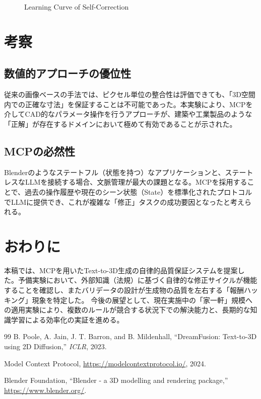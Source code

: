 \documentclass{deimj}
\begin{document}
\begin{figure}[t]
 \centering
 \caption{Learning Curve of Self-Correction}
 \label{fig:learning_curve}
\end{figure}

\section{考察}

\subsection{数値的アプローチの優位性}
従来の画像ベースの手法では、ピクセル単位の整合性は評価できても、「3D空間内での正確な寸法」を保証することは不可能であった。本実験により、MCPを介してCAD的なパラメータ操作を行うアプローチが、建築や工業製品のような「正解」が存在するドメインにおいて極めて有効であることが示された。

\subsection{MCPの必然性}
Blenderのようなステートフル（状態を持つ）なアプリケーションと、ステートレスなLLMを接続する場合、文脈管理が最大の課題となる。MCPを採用することで、過去の操作履歴や現在のシーン状態（State）を標準化されたプロトコルでLLMに提供でき、これが複雑な「修正」タスクの成功要因となったと考えられる。

\section{おわりに}
本稿では、MCPを用いたText-to-3D生成の自律的品質保証システムを提案した。予備実験において、外部知識（法規）に基づく自律的な修正サイクルが機能することを確認し、またバリデータの設計が生成物の品質を左右する「報酬ハッキング」現象を特定した。
今後の展望として、現在実施中の「家一軒」規模への適用実験により、複数のルールが競合する状況下での解決能力と、長期的な知識学習による効率化の実証を進める。

\vspace{2em}

\begin{thebibliography}{99}
  B. Poole, A. Jain, J. T. Barron, and B. Mildenhall,
  ``DreamFusion: Text-to-3D using 2D Diffusion,''
  \textit{ICLR}, 2023.

  Model Context Protocol,
  \url{https://modelcontextprotocol.io/}, 2024.

  Blender Foundation,
  ``Blender - a 3D modelling and rendering package,''
  \url{https://www.blender.org/}.
  
\end{thebibliography}
\end{document}
